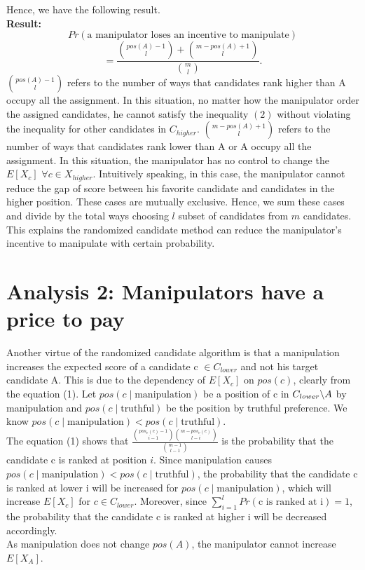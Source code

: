 \documentclass[letterpaper]{article} %
\begin{document}
Hence, we have the following result.\\
\textbf{Result:}
$$Pr(\text{a manipulator loses an incentive to manipulate})$$
\begin{equation}
 = \frac{\binom{pos(A)-1}{l}+\binom{m-pos(A)+1}{l}}{\binom{m}{l}}.
\end{equation}
$\binom{pos(A)-1}{l}$ refers to the number of ways that candidates rank higher than A occupy all the assignment. In this situation, no matter how the manipulator order the assigned candidates, he cannot satisfy the inequality $(2)$ without violating the inequality for other candidates in $C_{higher}$.
$\binom{m-pos(A)+1}{l}$ refers to the number of ways that candidates rank lower than A or A occupy all the assignment. In this situation, the manipulator has no control to change the $E[X_c]$ $\forall c \in X_{higher}$. Intuitively speaking, in this case, the manipulator cannot reduce the gap of score between his favorite candidate and candidates in the higher position. These cases are mutually exclusive. Hence, we sum these cases and divide by the total ways choosing $l$ subset of candidates from $m$ candidates. This explains the randomized candidate method can reduce the manipulator’s incentive to manipulate with certain probability. 

\section{Analysis 2: Manipulators have a price to pay}
Another virtue of the randomized candidate algorithm is that a manipulation increases the expected score of a candidate c $\in C_{lower}$ and not his target candidate A. This is due to the dependency of $E[X_c]$ on $pos(c)$, clearly from the equation (1). Let $pos(c \mid \text{manipulation})$ be a position of c in $C_{lower} \symbol{92}A$ by manipulation and $pos(c\mid \text{truthful})$ be the position by truthful preference. We know $pos(c \mid \text{manipulation}) < pos(c\mid \text{truthful})$. \\
The equation (1) shows that $ \frac{\binom{pos_v(c)-1}{i-1}\binom{m-pos_v(c)}{l-i}}{\binom{m-1}{l-1}}$ is the probability that the candidate c is ranked at position $i$. Since manipulation causes $pos(c \mid \text{manipulation}) < pos(c\mid \text{truthful})$, the probability that the candidate c is ranked at lower i will be increased for $pos(c \mid \text{manipulation})$, which will increase $E[X_c]$ for $c \in C_{lower}$. Moreover, since $\sum_{i=1}^l Pr(\text{c is ranked at i}) =1$,  the probability that the candidate c is ranked at higher i will be decreased accordingly.\\ As manipulation does not change $pos(A)$, the manipulator cannot increase $E[X_A]$.
\end{document}
